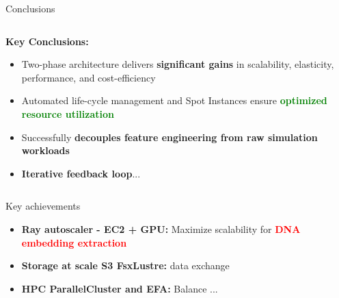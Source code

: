 \documentclass[aspectratio=169]{beamer}
\begin{document}
\begin{frame}{Conclusions}
    \begin{columns}
        \begin{column}{0.6\textwidth}
            \textbf{Key Conclusions:}
            \begin{itemize}
                \item Two-phase architecture delivers \textbf{significant gains} in scalability, elasticity, performance, and cost-efficiency
                \item Automated life-cycle management and Spot Instances ensure \textcolor{green}{\textbf{optimized resource utilization}}
                \item Successfully \textbf{decouples feature engineering from raw simulation workloads}
                \item \textbf{Iterative feedback loop}...
            \end{itemize}
        \end{column}
        \begin{column}{0.4\textwidth}
        \end{column}
    \end{columns}
    
    \vspace{0.3cm}
    \begin{block}{Key achievements}
        \begin{itemize}
            \item \textbf{Ray autoscaler - EC2 + GPU:} Maximize scalability for \textcolor{red}{\textbf{DNA embedding extraction}}
            \item \textbf{Storage at scale S3 FsxLustre:} data exchange
            \item \textbf{HPC ParallelCluster and EFA:} Balance ...
        \end{itemize}
    \end{block}
\end{frame}
\end{document}
